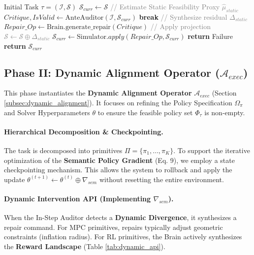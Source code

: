 \documentclass{article}
\theoremstyle{plain}
\theoremstyle{definition}
\theoremstyle{remark}
\begin{document}
\begin{algorithm}[tb]
   \caption{Static Alignment Loop ($\mathcal{A}_{perc}$)}
   \label{alg:static_repair}
\begin{algorithmic}
    Initial Task $\tau = (\mathcal{I}, \mathcal{S})$
   \STATE $\mathcal{S}_{curr} \leftarrow \mathcal{S}$
       \STATE \textcolor{gray}{// Estimate Static Feasibility Proxy $\hat{\mu}_{static}$}
       \STATE $Critique, IsValid \leftarrow \text{AnteAuditor}(\mathcal{I}, \mathcal{S}_{curr})$ 
           \STATE \textbf{break}
       \ENDIF
       \STATE \textcolor{gray}{// Synthesize residual $\Delta_{static}$}
       \STATE $Repair\_Op \leftarrow \text{Brain.generate\_repair}(Critique)$
       \STATE \textcolor{gray}{// Apply projection $\mathcal{S} \leftarrow \mathcal{S} \oplus \Delta_{static}$}
       \STATE $\mathcal{S}_{curr} \leftarrow \text{Simulator}.apply(Repair\_Op, \mathcal{S}_{curr})$
           \STATE \textbf{return} Failure
       \ENDIF
   \ENDWHILE
   \STATE \textbf{return} $\mathcal{S}_{curr}$
\end{algorithmic}
\end{algorithm}

\subsection{Phase II: Dynamic Alignment Operator ($\mathcal{A}_{exec}$)}
\label{sub:phase2_dynamic}

This phase instantiates the \textbf{Dynamic Alignment Operator} $\mathcal{A}_{exec}$ (Section \ref{subsec:dynamic_alignment}). It focuses on refining the Policy Specification $\Omega_\pi$ and Solver Hyperparameters $\theta$ to ensure the feasible policy set $\Phi_\tau$ is non-empty.

\paragraph{Hierarchical Decomposition \& Checkpointing.}
The task is decomposed into primitives $\Pi = \{\pi_1, \dots, \pi_K\}$. To support the iterative optimization of the \textbf{Semantic Policy Gradient} (Eq. 9), we employ a state checkpointing mechanism. This allows the system to rollback and apply the update $\theta^{(t+1)} \leftarrow \theta^{(t)} \oplus \nabla_{sem}$ without resetting the entire environment.

\paragraph{Dynamic Intervention API (Implementing $\nabla_{sem}$).}
When the In-Step Auditor detects a \textbf{Dynamic Divergence}, it synthesizes a repair command. For MPC primitives, repairs typically adjust geometric constraints (inflation radius). For RL primitives, the Brain actively synthesizes the \textbf{Reward Landscape} (Table \ref{tab:dynamic_api}).
\end{document}
